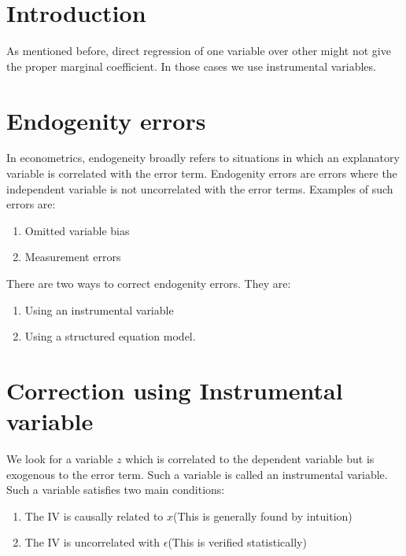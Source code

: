 \documentclass[notoc]{tufte-book}
\begin{document}
\section{Introduction}
As mentioned before, direct regression of one variable over other might not give the proper marginal coefficient. In those cases we use instrumental variables.
\section{Endogenity errors}
In econometrics, endogeneity broadly refers to situations in which an explanatory variable is correlated with the error term. Endogenity errors are errors where the independent variable is not uncorrelated with the error terms. Examples of such errors are:
\begin{enumerate}
    \item Omitted variable bias
    \item Measurement errors
\end{enumerate}
There are two ways to correct endogenity errors. They are:
\begin{enumerate}
    \item Using an instrumental variable
    \item Using a structured equation model.
\end{enumerate}
\section{Correction using Instrumental variable}
We look for a variable $z$ which is correlated to the dependent variable but is exogenous to the error term. Such a variable is called an instrumental variable. Such a variable satisfies two main conditions:
\begin{enumerate}
    \item The IV is causally related to $x$(This is generally found by intuition)
    \item The IV is uncorrelated with $\epsilon$(This is verified statistically)
\end{enumerate}
\end{document}

